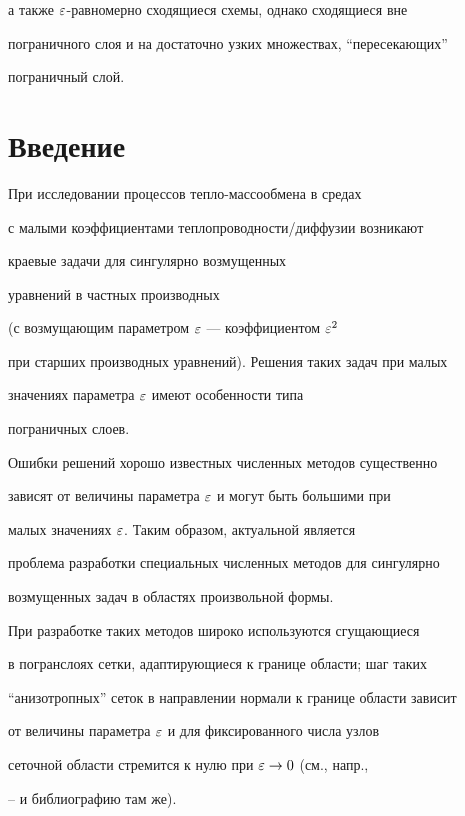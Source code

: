 а также $\varepsilon$-равномерно сходящиеся схемы, однако сходящиеся вне


пограничного слоя и на достаточно узких множествах, ``пересекающих''


пограничный слой.








\section{Введение}\label{section.1}





При исследовании процессов тепло-массообмена в средах


с малыми коэффициентами теплопроводности/диффузии возникают


краевые задачи для сингулярно возмущенных


уравнений в частных производных


(с возмущающим параметром $\varepsilon$ --- коэффициентом $\varepsilon^2$


при старших производных уравнений). Решения таких задач при малых


значениях параметра $\varepsilon$ имеют особенности типа


пограничных слоев.





Ошибки решений хорошо известных численных методов существенно


зависят от величины параметра $\varepsilon$ и могут быть большими при


малых значениях $\varepsilon$. Таким образом, актуальной является


проблема разработки специальных численных методов для сингулярно


возмущенных задач в областях произвольной формы.


При разработке таких методов широко используются сгущающиеся


в погранслоях сетки, адаптирующиеся к границе области; шаг таких


``анизотропных'' сеток в направлении нормали к границе области зависит


от величины параметра $\varepsilon$ и для фиксированного числа узлов


сеточной области стремится к нулю при $\varepsilon\to 0$ (см., напр.,


\cite{1}--\cite{4} и библиографию там же).





